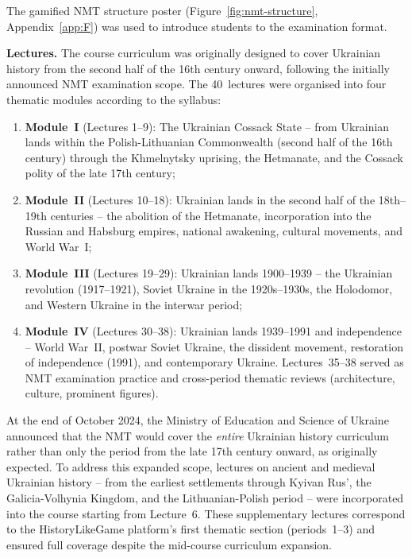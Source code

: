 The gamified NMT structure poster (Figure~\ref{fig:nmt-structure}, Appendix~\ref{app:F}) was used to introduce students to the examination format.

\textbf{Lectures.} The course curriculum was originally designed to cover Ukrainian history from the second half of the 16th century onward, following the initially announced NMT examination scope.  The 40~lectures were organised into four thematic modules according to the syllabus:

\begin{enumerate}
\item \textbf{Module~I} (Lectures 1--9): The Ukrainian Cossack State -- from Ukrainian lands within the Polish-Lithuanian Commonwealth (second half of the 16th century) through the Khmelnytsky uprising, the Hetmanate, and the Cossack polity of the late 17th century;
\item \textbf{Module~II} (Lectures 10--18): Ukrainian lands in the second half of the 18th--19th centuries -- the abolition of the Hetmanate, incorporation into the Russian and Habsburg empires, national awakening, cultural movements, and World War~I;
\item \textbf{Module~III} (Lectures 19--29): Ukrainian lands 1900--1939 -- the Ukrainian revolution (1917--1921), Soviet Ukraine in the 1920s--1930s, the Holodomor, and Western Ukraine in the interwar period;
\item \textbf{Module~IV} (Lectures 30--38): Ukrainian lands 1939--1991 and independence -- World War~II, postwar Soviet Ukraine, the dissident movement, restoration of independence (1991), and contemporary Ukraine. Lectures~35--38 served as NMT examination practice and cross-period thematic reviews (architecture, culture, prominent figures).
\end{enumerate}

At the end of October 2024, the Ministry of Education and Science of Ukraine announced that the NMT would cover the \emph{entire} Ukrainian history curriculum rather than only the period from the late 17th century onward, as originally expected.  To address this expanded scope, lectures on ancient and medieval Ukrainian history -- from the earliest settlements through Kyivan Rus', the Galicia-Volhynia Kingdom, and the Lithuanian-Polish period -- were incorporated into the course starting from Lecture~6. These supplementary lectures correspond to the HistoryLikeGame platform's first thematic section (periods~1--3) and ensured full coverage despite the mid-course curriculum expansion.

